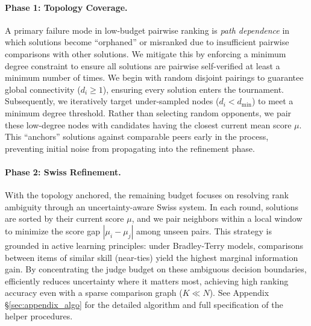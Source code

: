 \paragraph{Phase 1: Topology Coverage.}
A primary failure mode in low-budget pairwise ranking is \textit{path dependence} in which solutions become ``orphaned'' or misranked due to insufficient pairwise comparisons with other solutions. We mitigate this by enforcing a minimum degree constraint to ensure all solutions are pairwise self-verified at least a minimum number of times. We begin with random disjoint pairings to guarantee global connectivity ($d_i \ge 1$), ensuring every solution enters the tournament. Subsequently, we iteratively target under-sampled nodes ($d_i < d_{\min}$) to meet a minimum degree threshold. Rather than selecting random opponents, we pair these low-degree nodes with candidates having the closest current mean score $\mu$. This ``anchors'' solutions against comparable peers early in the process, preventing initial noise from propagating into the refinement phase.

\paragraph{Phase 2: Swiss Refinement.}
With the topology anchored, the remaining budget focuses on resolving rank ambiguity through an uncertainty-aware Swiss system. In each round, solutions are sorted by their current score $\mu$, and we pair neighbors within a local window to minimize the score gap $|\mu_i - \mu_j|$ among unseen pairs. This strategy is grounded in active learning principles: under Bradley-Terry models, comparisons between items of similar skill (near-ties) yield the highest marginal information gain. By concentrating the judge budget on these ambiguous decision boundaries, \pairinfer{} efficiently reduces uncertainty where it matters most, achieving high ranking accuracy even with a sparse comparison graph ($K \ll N$). See Appendix \S\ref{sec:appendix_algo} for the detailed algorithm and full specification of the helper procedures.


